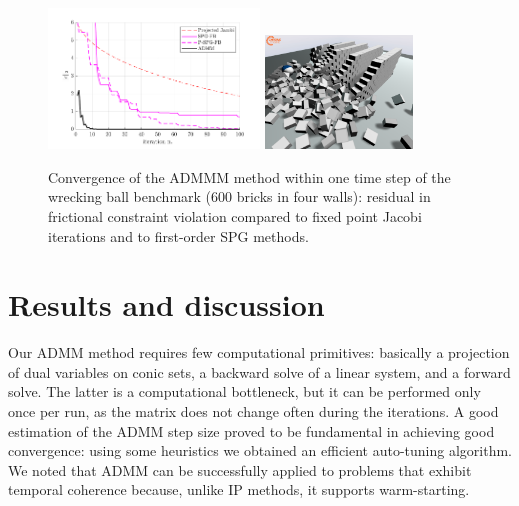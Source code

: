 \documentclass[11pt]{nodycon2021}
\begin{document}
\begin{figure}[h!]
\centering
\includegraphics[width=0.50\textwidth]{t8_convergence.pdf}
\includegraphics[width=0.35\textwidth, trim=0cm -3cm 0 3cm]{t8_snapshot.png}
\caption{Convergence of the ADMMM method within one time step of the wrecking ball benchmark (600 bricks in four walls): residual in frictional constraint   violation compared to fixed point Jacobi iterations and to first-order SPG methods.}
\end{figure}




\section{Results and discussion}
 
Our ADMM method requires few computational primitives: basically a projection of dual variables on conic sets, a backward solve of a linear system, and a forward solve. The latter is a computational bottleneck, but it can be performed only once per run, as the matrix does not change often during the iterations. 
A good estimation of the ADMM step size proved to be fundamental in achieving good convergence: using some heuristics we obtained an efficient auto-tuning algorithm. 
We noted that ADMM can be successfully applied to problems that exhibit temporal coherence because, unlike IP methods, it supports warm-starting.









 
\end{document}
